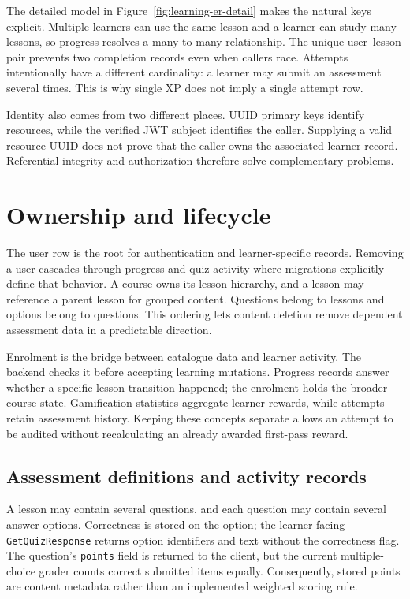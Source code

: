\documentclass[12pt,a4paper,oneside]{report}
\begin{document}
\learningerdetaildiagram

The detailed model in Figure~\ref{fig:learning-er-detail} makes the natural keys
explicit. Multiple learners can use the same lesson and a learner can study many
lessons, so progress resolves a many-to-many relationship. The unique user--lesson
pair prevents two completion records even when callers race. Attempts intentionally
have a different cardinality: a learner may submit an assessment several times.
This is why single XP does not imply a single attempt row.

Identity also comes from two different places. UUID primary keys identify resources,
while the verified JWT subject identifies the caller. Supplying a valid resource UUID
does not prove that the caller owns the associated learner record. Referential
integrity and authorization therefore solve complementary problems.

\section{Ownership and lifecycle}
The user row is the root for authentication and learner-specific records. Removing a
user cascades through progress and quiz activity where migrations explicitly define
that behavior. A course owns its lesson hierarchy, and a lesson may reference a
parent lesson for grouped content. Questions belong to lessons and options belong to
questions. This ordering lets content deletion remove dependent assessment data in a
predictable direction.

Enrolment is the bridge between catalogue data and learner activity. The backend
checks it before accepting learning mutations. Progress records answer whether a
specific lesson transition happened; the enrolment holds the broader course state.
Gamification statistics aggregate learner rewards, while attempts retain assessment
history. Keeping these concepts separate allows an attempt to be audited without
recalculating an already awarded first-pass reward.

\subsection{Assessment definitions and activity records}
A lesson may contain several questions, and each question may contain several
answer options. Correctness is stored on the option; the learner-facing
\texttt{GetQuizResponse} returns option identifiers and text without the correctness
flag. The question's \texttt{points} field is returned to the client, but the current
multiple-choice grader counts correct submitted items equally. Consequently, stored
points are content metadata rather than an implemented weighted scoring rule.
\end{document}
